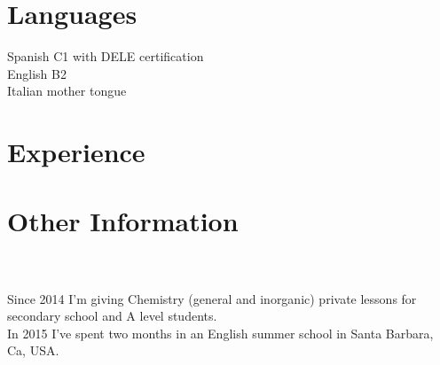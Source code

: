 \documentclass[]{twentysecondcv}
\begin{document}
\section{Languages}

Spanish C1 with DELE certification \\
English B2 \\
Italian mother tongue \\

\section{Experience}
\begin{twenty}
\end{twenty}

\section{Other Information} \\ \\
Since 2014 I'm giving Chemistry (general and inorganic) private lessons for secondary school and A level students. \\
In 2015 I've spent two months in an English summer school in Santa Barbara, Ca, USA.
\end{document}
